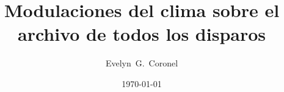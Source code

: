 



\title{Modulaciones del clima sobre el archivo de todos los disparos}
\author{Evelyn~G.~Coronel}


\date[]{\lowercase{\today}} %


\maketitle


